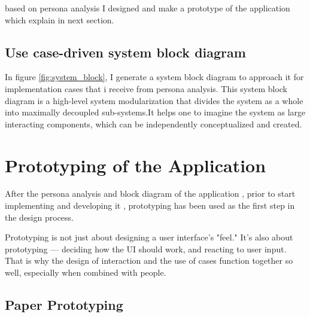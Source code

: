 based on persona analysis I designed and make a prototype of the application which explain in next section.

\subsection{Use case-driven system block diagram}
In figure \ref{fig:system_block}, I generate a system block diagram to approach it for implementation cases that i receive from persona analysis. This system block diagram is a high-level system modularization that divides the system as a whole into maximally decoupled sub-systems.It helps one to imagine the system as large interacting components, which can be independently conceptualized and created.


\section{Prototyping of the Application}

After the persona analysis and block diagram of the application , prior to start implementing and developing it , prototyping has been used as the first step in the design process.

Prototyping is not just about designing a user interface's "feel." It's also about prototyping — deciding how the \acs{UI} should work, and reacting to user input. That is why the design of interaction and the use of cases function together so well, especially when combined with people.\citep{Stephens2006PersonaAnalysis}

\subsection{Paper Prototyping}

